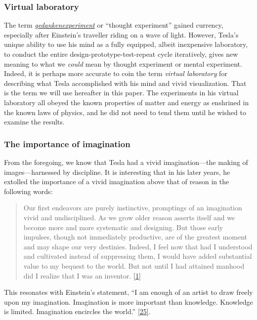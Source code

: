 \documentclass[
  12pt,
  british,
  a4paper,
  rgb,
  dvipsnames,
  svgnames,
  hyphens]{article}
\begin{document}
\hypertarget{virtual-laboratory}{%
\subsubsection{Virtual laboratory}\label{virtual-laboratory}}

The term
\href{https://www.britannica.com/science/Gedankenexperiment}{\emph{gedankenexperiment}}
or ``thought experiment'' gained currency, especially after Einstein's
traveller riding on a wave of light. However, Tesla's unique ability to
use his mind as a fully equipped, albeit inexpensive laboratory, to
conduct the entire design-prototype-test-repeat cycle iteratively, gives
new meaning to what we \emph{could} mean by thought experiment or mental
experiment. Indeed, it is perhaps more accurate to coin the term
\emph{virtual laboratory} for describing what Tesla accomplished with
his mind and vivid visualization. That is the term we will use hereafter
in this paper. The experiments in his virtual laboratory all obeyed the
known properties of matter and energy as enshrined in the known laws of
physics, and he did not need to tend them until he wished to examine the
results.

\hypertarget{the-importance-of-imagination}{%
\subsubsection{The importance of
imagination}\label{the-importance-of-imagination}}

From the foregoing, we know that Tesla had a vivid imagination---the
making of images---harnessed by discipline. It is interesting that in
his later years, he extolled the importance of a vivid imagination above
that of reason in the following words:

\begin{quote}
Our first endeavors are purely instinctive, promptings of an imagination
vivid and undisciplined. As we grow older reason asserts itself and we
become more and more systematic and designing. But those early impulses,
though not immediately productive, are of the greatest moment and may
shape our very destinies. Indeed, I feel now that had I understood and
cultivated instead of suppressing them, I would have added substantial
value to my bequest to the world. But not until I had attained manhood
did I realize that I was an inventor.
\protect\hyperlink{ref-john83}{{[}1{]}}
\end{quote}

This resonates with Einstein's statement, ``I am enough of an artist to
draw freely upon my imagination. Imagination is more important than
knowledge. Knowledge is limited. Imagination encircles the world.''
\protect\hyperlink{ref-einstein-quote}{{[}25{]}}.
\end{document}
